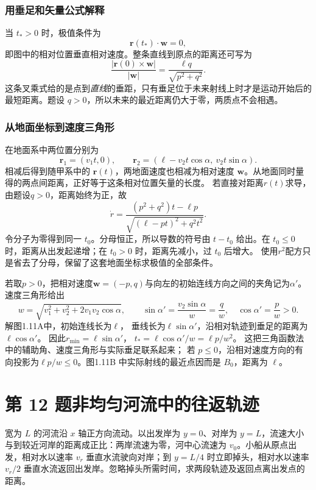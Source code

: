 \documentclass[UTF8,fontset=fandol,a4paper,11pt]{ctexart}
\newcommand{\vect}[1]{\bm{#1}}
\newcommand{\tagline}[1]{\noindent{\small\color{muted}#1}\par}
\begin{document}
\subsubsection*{用垂足和矢量公式解释}
当 $t_*>0$ 时，极值条件为
\[
\vect r(t_*)\cdot\vect w=0,
\]
即图中的相对位置垂直相对速度。整条直线到原点的距离还可写为
\[
\frac{|\vect r(0)\times\vect w|}{|\vect w|}
=\frac{\ell q}{\sqrt{p^2+q^2}}.
\]
这条叉乘式给的是点到\emph{直线}的垂距，只有垂足位于未来射线上时才是运动开始后的最短距离。题设 $q>0$，所以未来的最近距离仍大于零，两质点不会相遇。
\subsubsection*{从地面坐标到速度三角形}
在地面系中两位置分别为
\[
\vect r_1=(v_1t,0),\qquad
\vect r_2=(\ell-v_2t\cos\alpha,\ v_2t\sin\alpha).
\]
相减后得到随甲系中的 $\vect r(t)$，两地面速度也相减为相对速度 $\vect w$。从地面同时量得的两点间距离，正好等于这条相对位置矢量的长度。
若直接对距离$r(t)$求导，由题设$q>0$，距离始终为正，故
\[
\dot r=\frac{(p^2+q^2)t-\ell p}
{\sqrt{(\ell-pt)^2+q^2t^2}}.
\]
令分子为零得到同一 $t_0$。分母恒正，所以导数的符号由 $t-t_0$ 给出。在 $t_0\leq0$ 时，距离从出发起递增；在 $t_0>0$ 时，距离先减小，过 $t_0$ 后增大。
使用$r^2$配方只是省去了分母，保留了这套地面坐标求极值的全部条件。

若取$p>0$，把相对速度$\vect w=(-p,q)$与向左的初始连线方向之间的夹角记为$\alpha'$。
速度三角形给出
\[
w=\sqrt{v_1^2+v_2^2+2v_1v_2\cos\alpha},\qquad
\sin\alpha'=\frac{v_2\sin\alpha}{w}=\frac q w,\quad
\cos\alpha'=\frac p w>0.
\]
解图1.11A中，初始连线长为$\ell$，
垂线长为$\ell\sin\alpha'$，沿相对轨迹到垂足的距离为$\ell\cos\alpha'$。
因此$r_{\min}=\ell\sin\alpha'$，
$t_*=\ell\cos\alpha'/w=\ell p/w^2$。
这把三角函数法中的辅助角、速度三角形与实际垂足联系起来；
若 $p\leq0$，沿相对速度方向的有向投影为$\ell p/w\leq0$。图1.11B 中实际射线的最近点因而是 $B_0$，距离为 $\ell$。




\section*{第 12 题\quad 非均匀河流中的往返轨迹}

\tagline{M-01-12}

宽为 $L$ 的河流沿 $x$ 轴正方向流动。以出发岸为 $y=0$、对岸为 $y=L$，流速大小与到较近河岸的距离成正比：两岸流速为零，河中心流速为 $v_0$。小船从原点出发，相对水以速率 $v_r$ 垂直水流驶向对岸；到 $y=L/4$ 时立即掉头，相对水以速率 $v_r/2$ 垂直水流返回出发岸。忽略掉头所需时间，求两段轨迹及返回点离出发点的距离。
\end{document}
